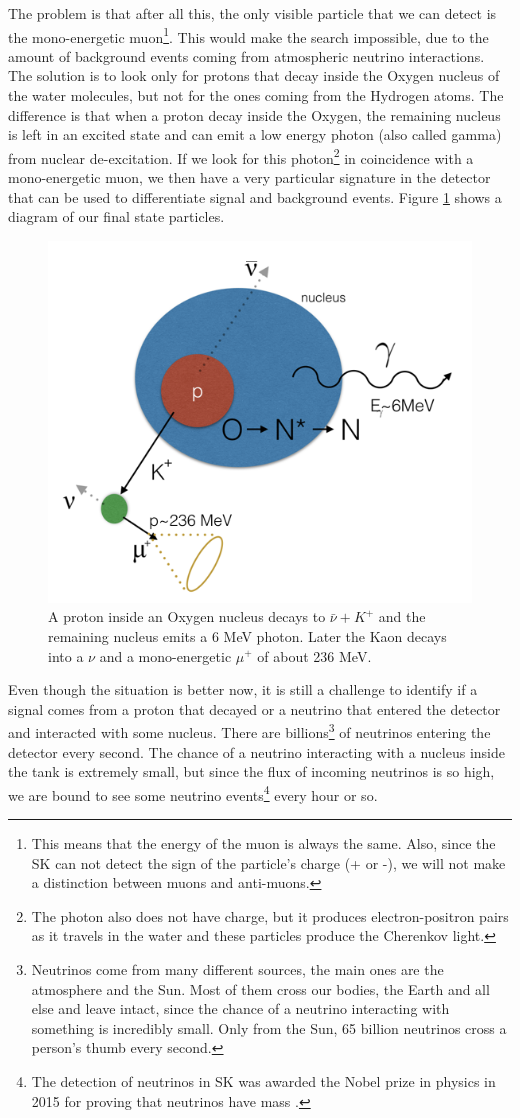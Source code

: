 The problem is that after all this, the only visible particle that we can detect is the mono-energetic muon\footnote{This means that the energy of the muon is always the same. Also, since the SK can not detect the sign of the particle's charge (+ or -), we will not make a distinction between muons and anti-muons.}. This would make the search impossible, due to the amount of background events coming from atmospheric neutrino interactions. The solution is to look only for protons that decay inside the Oxygen nucleus of the water molecules, but not for the ones coming from the Hydrogen atoms. The difference is that when a proton decay inside the Oxygen, the remaining nucleus is left in an excited state and can emit a low energy photon (also called gamma) from nuclear de-excitation. If we look for this photon\footnote{The photon also does not have charge, but it produces electron-positron pairs as it travels in the water and these particles produce the Cherenkov light.} in coincidence with a mono-energetic muon, we then have a very particular signature in the detector that can be used to differentiate signal and background events. Figure \ref{fig:pdecay} shows a diagram of our final state particles.

\begin{figure}[h]
  \centering
  \includegraphics[width=0.37\linewidth]{figs/mugamma_mode.png}
  \caption{A proton inside an Oxygen nucleus decays to $\bar{\nu} + K^{+}$ and the remaining nucleus emits a 6 MeV photon. Later the Kaon decays into a $\nu$  and a mono-energetic  $\mu^{+}$ of about 236 MeV.}
  \label{fig:pdecay}
\end{figure}

Even though the situation is better now, it is still a challenge to identify if a signal comes from a proton that decayed or a neutrino that entered the detector and interacted with some nucleus. There are billions\footnote{Neutrinos come from many different sources, the main ones are the atmosphere and the Sun. Most of them cross our bodies, the Earth and all else and leave intact, since the chance of a neutrino interacting with something is incredibly small. Only from the Sun, 65 billion neutrinos cross a  person's thumb every second.} of neutrinos entering the detector every second. The chance of a neutrino interacting with a nucleus inside the tank is extremely small, but since the flux of incoming neutrinos is so high, we are bound to see some neutrino events\footnote{The detection of neutrinos in SK was awarded the Nobel prize in physics in 2015 for proving that neutrinos have mass \cite{Nobel}.} every hour or so.

